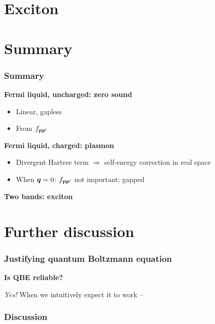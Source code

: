 \documentclass{beamer}
\begin{document}
\section{Exciton}

\section{Summary}

\begin{frame}
\frametitle{Summary}

\textbf{Fermi liquid, uncharged: zero sound} 
\begin{itemize}
    \item Linear, gapless 
    \item From $f_{\vb*{p} \vb*{p}'}$ 
\end{itemize}

\vspace{0.5cm}

\textbf{Fermi liquid, charged: plasmon} \begin{itemize}
    \item Divergent Hartree term $\Rightarrow$ self-energy correction in real space 
    \item When $\vb*{q} = 0$: $f_{\vb*{p} \vb*{p}'}$ not important; gapped
\end{itemize}

\vspace{0.5cm}

\textbf{Two bands: exciton} 

\end{frame}

\section{Further discussion}

\begin{frame}
\frametitle{Justifying quantum Boltzmann equation}

\textbf{Is QBE reliable?}

\emph{Yes!} When we intuitively expect it to work --

\begin{center}
    
\end{center}

\end{frame}

\begin{frame}
\frametitle{Discussion}



\end{frame}
\end{document}
